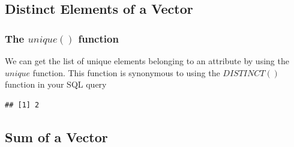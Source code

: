 \subsection{Distinct Elements of a Vector}
\subsubsection{The $unique()$ function}
\noindent We can get the list of unique elements belonging to an attribute by using the $unique$ function. This function is synonymous to using the $DISTINCT()$ function in your SQL query  
\begin{knitrout}
\color{fgcolor}\begin{kframe}
\begin{alltt}
\hlkwb{<-} \hlstd{(}\hlstd{,}\hlstd{)} 
 
\end{alltt}
\begin{verbatim}
## [1] 2
\end{verbatim}
\end{kframe}
\end{knitrout}
\subsection{Sum of a Vector}
